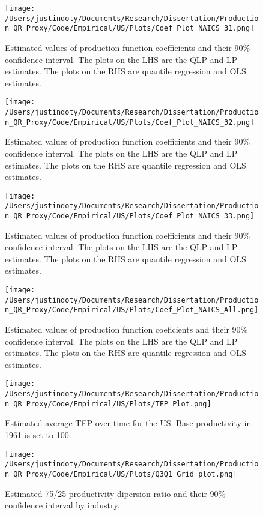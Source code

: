 \documentclass[11pt]{article}
\begin{document}
\begin{figure}[H]
\centering
\texttt{[image: /Users/justindoty/Documents/Research/Dissertation/Production\_QR\_Proxy/Code/Empirical/US/Plots/Coef\_Plot\_NAICS\_31.png]}
\caption{Estimated values of production function coefficients and their 90\% confidence interval. The plots on the LHS are the QLP and LP estimates. The plots on the RHS are quantile regression and OLS estimates.}
\label{fig:31coef}
\end{figure}

\begin{figure}[H]
\centering
\texttt{[image: /Users/justindoty/Documents/Research/Dissertation/Production\_QR\_Proxy/Code/Empirical/US/Plots/Coef\_Plot\_NAICS\_32.png]}
\caption{Estimated values of production function coefficients and their 90\% confidence interval. The plots on the LHS are the QLP and LP estimates. The plots on the RHS are quantile regression and OLS estimates.}
\label{fig:32coef}
\end{figure}

\begin{figure}[H]
\centering
\texttt{[image: /Users/justindoty/Documents/Research/Dissertation/Production\_QR\_Proxy/Code/Empirical/US/Plots/Coef\_Plot\_NAICS\_33.png]}
\caption{Estimated values of production function coefficients and their 90\% confidence interval. The plots on the LHS are the QLP and LP estimates. The plots on the RHS are quantile regression and OLS estimates.}
\label{fig:33coef}
\end{figure}

\begin{figure}[H]
\centering
\texttt{[image: /Users/justindoty/Documents/Research/Dissertation/Production\_QR\_Proxy/Code/Empirical/US/Plots/Coef\_Plot\_NAICS\_All.png]}
\caption{Estimated values of production function coeficients and their 90\% confidence interval. The plots on the LHS are the QLP and LP estimates. The plots on the RHS are quantile regression and OLS estimates.}
\label{fig:USallcoef}
\end{figure}

\begin{figure}[H]
\centering
\texttt{[image: /Users/justindoty/Documents/Research/Dissertation/Production\_QR\_Proxy/Code/Empirical/US/Plots/TFP\_Plot.png]}
\caption{Estimated average TFP over time for the US. Base productivity in 1961 is set to 100.}
\end{figure}

\begin{figure}[H]
\centering
\texttt{[image: /Users/justindoty/Documents/Research/Dissertation/Production\_QR\_Proxy/Code/Empirical/US/Plots/Q3Q1\_Grid\_plot.png]}
\caption{Estimated 75/25 productivity dipersion ratio and their 90\% confidence interval by industry.}
\end{figure}
\end{document}

